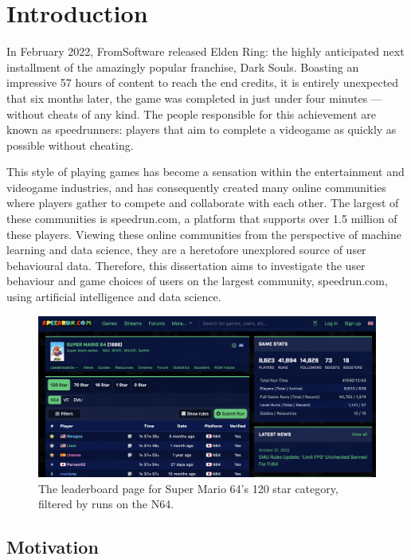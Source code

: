 \section{Introduction}

In February 2022, FromSoftware released Elden Ring: the highly anticipated next installment of the amazingly popular franchise, Dark Souls. Boasting an impressive 57 hours of content to reach the end credits, it is entirely unexpected that six months later, the game was completed in just under four minutes — without cheats of any kind. The people responsible for this achievement are known as speedrunners: players that aim to complete a videogame as quickly as possible without cheating. 

This style of playing games has become a sensation within the entertainment and videogame industries, and has consequently created many online communities where players gather to compete and collaborate with each other. The largest of these communities is speedrun.com, a platform that supports over 1.5 million of these players. Viewing these online communities from the perspective of machine learning and data science, they are a heretofore unexplored source of user behavioural data. Therefore, this dissertation aims to investigate the user behaviour and game choices of users on the largest community, speedrun.com, using artificial intelligence and data science.

\begin{figure}[h]
    \centering
    \includegraphics[width=0.8\linewidth]{images/sm64_cropped.png}
    \caption{The leaderboard page for Super Mario 64's 120 star category, filtered by runs on the N64.}
    \label{fig:my_label}
\end{figure}

\vspace{-5pt}
\subsection{Motivation}

